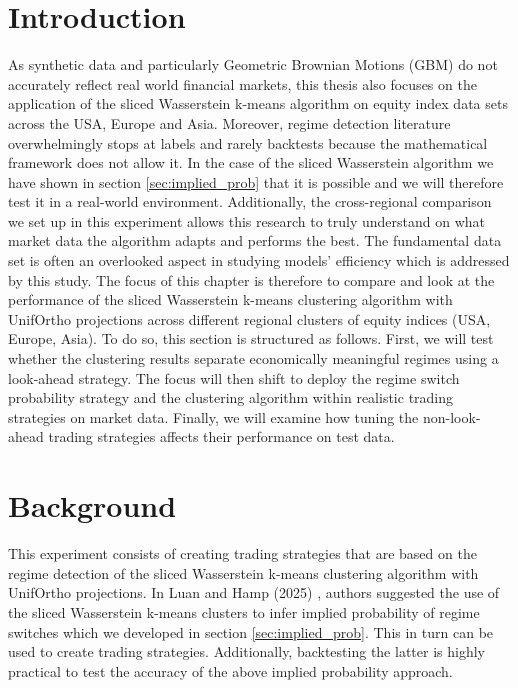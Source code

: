 \documentclass[12pt,a4paper]{report}
\begin{document}
\section{Introduction}
As synthetic data and particularly Geometric Brownian Motions (GBM) do not accurately reflect real world financial markets, this thesis also focuses on the application of the sliced Wasserstein k-means algorithm on equity index data sets across the USA, Europe and Asia.
Moreover, regime detection literature overwhelmingly stops at labels and rarely backtests because the mathematical framework does not allow it. In the case of the sliced Wasserstein algorithm
we have shown in section \ref{sec:implied_prob} that it is possible and we will therefore test it in a real-world environment. 
Additionally, the cross-regional comparison we set up in this experiment allows this research to truly understand on what market data the algorithm adapts and performs the best. 
The fundamental data set is often an overlooked aspect in studying models' efficiency which is addressed by this study.
The focus of this chapter is therefore to compare and look at the performance of the sliced Wasserstein k-means clustering algorithm with UnifOrtho projections across different regional clusters of equity indices (USA, Europe, Asia).
To do so, this section is structured as follows. 
First, we will test whether the clustering results separate economically meaningful regimes using a look-ahead strategy. 
The focus will then shift to deploy the regime switch probability strategy and the clustering algorithm within realistic trading strategies on market data. 
Finally, we will examine how tuning the non-look-ahead trading strategies affects their performance on test data.  

\section{Background}
This experiment consists of creating trading strategies that are based on the regime detection of the sliced Wasserstein k-means clustering algorithm with UnifOrtho projections.
In Luan and Hamp (2025) \cite{LuanHamp2025}, authors suggested the use of the sliced Wasserstein k-means clusters to infer implied probability of regime switches which we developed in section \ref{sec:implied_prob}.
This in turn can be used to create trading strategies. Additionally, backtesting the latter is highly practical to test the accuracy of the above implied probability approach.
\end{document}
